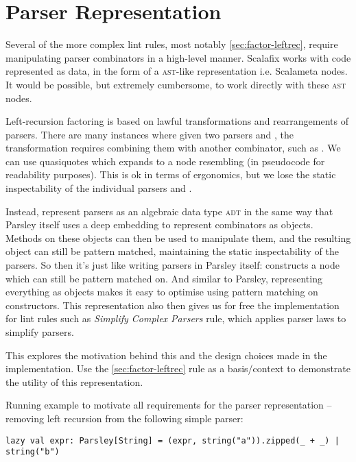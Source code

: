 \documentclass[../../main.tex]{subfiles}
\begin{document}
\section{Parser Representation}\label{sec:parser-representation}

Several of the more complex lint rules, most notably \cref{sec:factor-leftrec}, require manipulating parser combinators in a high-level manner.
Scalafix works with code represented as data, in the form of a \textsc{ast}-like representation i.e. Scalameta  nodes.
It would be possible, but extremely cumbersome, to work directly with these \textsc{ast} nodes.

Left-recursion factoring is based on lawful transformations and rearrangements of parsers.
There are many instances where given two parsers  and , the transformation requires combining them with another combinator, such as \scala{<*>}.
We can use quasiquotes  which expands to a  node resembling  (in pseudocode for readability purposes).
This is ok in terms of ergonomics, but we lose the static inspectability of the individual parsers  and .

Instead, represent parsers as an algebraic data type \textsc{adt} in the same way that Parsley itself uses a deep embedding to represent combinators as objects.
Methods on these objects can then be used to manipulate them, and the resulting object can still be pattern matched, maintaining the static inspectability of the parsers.
So then it's just like writing parsers in Parsley itself:  constructs a  node which can still be pattern matched on.
And similar to Parsley, representing everything as objects makes it easy to optimise using pattern matching on constructors.
This representation also then gives us for free the implementation for lint rules such as \emph{Simplify Complex Parsers} rule, which applies parser laws to simplify parsers.

This  explores the motivation behind this and the design choices made in the implementation.
Use the \cref{sec:factor-leftrec} rule as a basis/context to demonstrate the utility of this representation.

Running example to motivate all requirements for the parser representation -- removing left recursion from the following simple parser:
\begin{verbatim}
lazy val expr: Parsley[String] = (expr, string("a")).zipped(_ + _) | string("b")
\end{verbatim}
\end{document}
